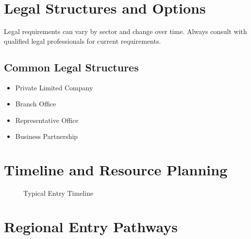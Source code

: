 \section{Legal Structures and Options}

\begin{warningbox}
Legal requirements can vary by sector and change over time. Always consult with qualified legal professionals for current requirements.
\end{warningbox}

\subsection{Common Legal Structures}
\begin{itemize}
    \item Private Limited Company
    \item Branch Office
    \item Representative Office
    \item Business Partnership
\end{itemize}

\section{Timeline and Resource Planning}

\begin{figure}[h]
    \centering
    \caption{Typical Entry Timeline}
\end{figure}

\section{Regional Entry Pathways}

